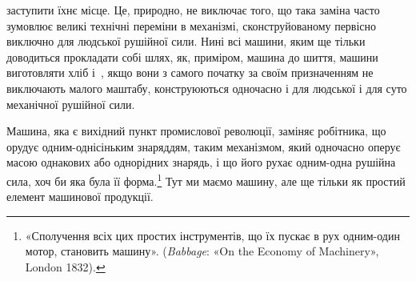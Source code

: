 \parcont{}  %
заступити їхнє місце. Це, природно, не виключає того, що така
заміна часто зумовлює великі технічні переміни в механізмі,
сконструйованому первісно виключно для людської рушійної
сили. Нині всі машини, яким ще тільки доводиться прокладати
собі шлях, як, приміром, машина до шиття, машини виготовляти
хліб і~, якщо вони з самого початку за своїм призначенням не
виключають малого маштабу, конструюються одночасно і для людської
і для суто механічної рушійної сили.

Машина, яка є вихідний пункт промислової революції, заміняє
робітника, що орудує одним-однісіньким знаряддям, таким механізмом,
який одночасно оперує масою однакових або однорідних
знарядь, і що його рухає одним-одна рушійна сила, хоч би яка
була її форма.\footnote{
«Сполучення всіх цих простих інструментів, що їх пускає в рух
одним-один мотор, становить машину». (\emph{Babbage}: «On the Economy
of Machinery», London 1832).
} Тут ми маємо машину, але ще тільки як простий
елемент машинової продукції.

